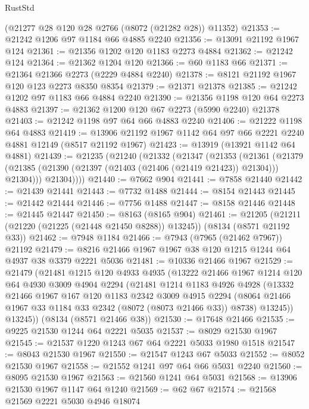 \begin{lexlean}{RustStd}
\begin{coremodule}
{\begin{coremodule}
{{{{{{{{{{{{{{{{{{{{{{{{{{{{{{{{{{{{{{{{{{{{{{{{{{{{{    (@21277 @28 @120 @28 @2766 (@8072 (@21282 @28)) @11352)
@21353 := @21242 @1206 @97 @1184 @66 @4885 @2240
@21356 := @13091 @21192 @1967 @124
@21361 := @21356 @1202 @120 @1183 @2273 @4884
@21362 := @21242 @124
@21364 := @21362 @1204 @120
@21366 := @60 @1183 @66
@21371 := @21364 @21366 @2273 (@2229 @4884 @2240)
@21378 := @8121 @21192 @1967 @120 @123 @2273 @8350 @8354
@21379 := @21371 @21378
@21385 := @21242 @1202 @97 @1183 @66 @4884 @2240
@21390 := @21356 @1198 @120 @64 @2273 @4883
@21397 := @21362 @1200 @120 @67 @2273 (@5990 @2240) @21378
@21403 := @21242 @1198 @97 @64 @66 @4883 @2240
@21406 := @21222 @1198 @64 @4883
@21419 := @13906 @21192 @1967 @1142 @64 @97 @66 @2221 @2240 @4881 @12149 (@8517 @21192 @1967)
@21423 := @13919 (@13921 @1142 @64 @4881)
@21439 := @21235
    (@21240
      (@21332
        (@21347
          (@21353
            (@21361
              (@21379 (@21385 (@21390 (@21397 (@21403 (@21406 (@21419 @21423)) @21304))) @21304)))
            @21304))))
@21440 := @7662 @904
@21441 := @7858 @21440
@21442 := @21439 @21441
@21443 := @7732 @1488
@21444 := @8154 @21443
@21445 := @21442 @21444
@21446 := @7756 @1488
@21447 := @8158 @21446
@21448 := @21445 @21447
@21450 := @8163 (@8165 @904)
@21461 := @21205 (@21211 (@21220 (@21225 (@21448 @21450 @8288)) @13245)) (@8134 (@8571 @21192 @33))
@21462 := @7948 @1184
@21466 := @7943 (@7965 (@21462 @7967)) @21192
@21479 := @8216 @21466 @1967 @1967 @38 @120 @1215 @1244 @64 @4937 @38 @3379 @2221 @5036
@21481 := @10336 @21466 @1967
@21529 := @21479
    (@21481
      @1215
      @120
      @4933
      @4935
      (@13222
        @21466
        @1967
        @1214
        @120
        @64
        @4930
        @3009
        @4904
        @2294
        (@21481
          @1214
          @1183
          @4926
          @4928
          (@13332
            @21466
            @1967
            @167
            @120
            @1183
            @2342
            @3009
            @4915
            @2294
            (@8064 @21466 @1967 @33 @1184 @33 @2342 (@8072 (@8073 @21466 @33)) @8738)
            @13245))
        @13245))
    (@8134 (@8571 @21466 @38))
@21530 := @17648 @21466
@21535 := @9225 @21530 @1244 @64 @2221 @5035
@21537 := @8029 @21530 @1967
@21545 := @21537 @1220 @1243 @67 @64 @2221 @5033 @1980 @1518
@21547 := @8043 @21530 @1967
@21550 := @21547 @1243 @67 @5033
@21552 := @8052 @21530 @1967
@21558 := @21552 @1241 @97 @64 @66 @5031 @2240
@21560 := @8095 @21530 @1967
@21563 := @21560 @1241 @64 @5031
@21568 := @13906 @21530 @1967 @1147 @64 @1240
@21569 := @62 @67
@21574 := @21568 @21569 @2221 @5030 @4946 @18074
}}}}}}}}}}}}}}}}}}}}}}}}}}}}}}}}}}}}}}}}}}}}}}}}}}}}}
\end{coremodule}}
\end{coremodule}
\end{lexlean}
